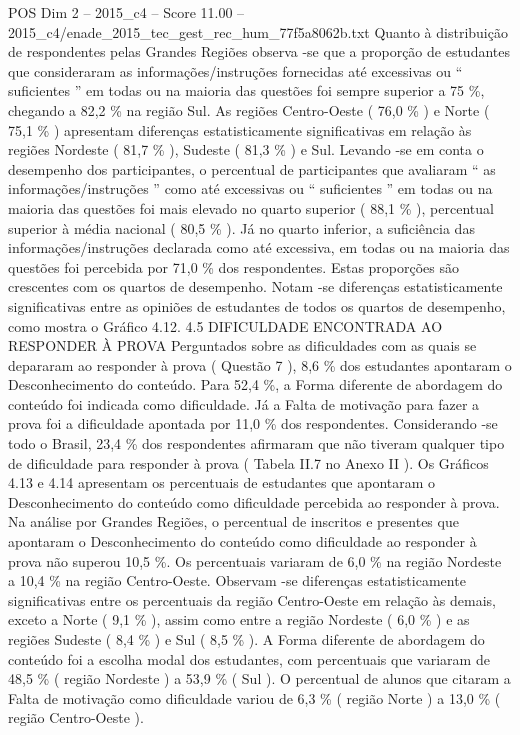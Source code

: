 \begin{textsample}{POS Dim 2 – 2015\_c4 – Score 11.00 – 2015\_c4/enade\_2015\_tec\_gest\_rec\_hum\_77f5a8062b.txt}
Quanto à distribuição de respondentes pelas Grandes Regiões observa -se que a proporção de estudantes que consideraram as informações/instruções fornecidas até excessivas ou “ suficientes ” em todas ou na maioria das questões foi sempre superior a 75 \%, chegando a 82,2 \% na região Sul.
As regiões Centro-Oeste ( 76,0 \% ) e Norte ( 75,1 \% ) apresentam diferenças estatisticamente significativas em relação às regiões Nordeste ( 81,7 \% ), Sudeste ( 81,3 \% ) e Sul.
Levando -se em conta o desempenho dos participantes, o percentual de participantes que avaliaram “ as informações/instruções ” como até excessivas ou “ suficientes ” em todas ou na maioria das questões foi mais elevado no quarto superior ( 88,1 \% ), percentual superior à média nacional ( 80,5 \% ).
Já no quarto inferior, a suficiência das informações/instruções declarada como até excessiva, em todas ou na maioria das questões foi percebida por 71,0 \% dos respondentes.
Estas proporções são crescentes com os quartos de desempenho.
Notam -se diferenças estatisticamente significativas entre as opiniões de estudantes de todos os quartos de desempenho, como mostra o Gráfico 4.12. 4.5 DIFICULDADE ENCONTRADA AO RESPONDER À PROVA Perguntados sobre as dificuldades com as quais se depararam ao responder à prova ( Questão 7 ), 8,6 \% dos estudantes apontaram o Desconhecimento do conteúdo.
Para 52,4 \%, a Forma diferente de abordagem do conteúdo foi indicada como dificuldade.
Já a Falta de motivação para fazer a prova foi a dificuldade apontada por 11,0 \% dos respondentes.
Considerando -se todo o Brasil, 23,4 \% dos respondentes afirmaram que não tiveram qualquer tipo de dificuldade para responder à prova ( Tabela II.7 no Anexo II ).
Os Gráficos 4.13 e 4.14 apresentam os percentuais de estudantes que apontaram o Desconhecimento do conteúdo como dificuldade percebida ao responder à prova.
Na análise por Grandes Regiões, o percentual de inscritos e presentes que apontaram o Desconhecimento do conteúdo como dificuldade ao responder à prova não superou 10,5 \%.
Os percentuais variaram de 6,0 \% na região Nordeste a 10,4 \% na região Centro-Oeste.
Observam -se diferenças estatisticamente significativas entre os percentuais da região Centro-Oeste em relação às demais, exceto a Norte ( 9,1 \% ), assim como entre a região Nordeste ( 6,0 \% ) e as regiões Sudeste ( 8,4 \% ) e Sul ( 8,5 \% ).
A Forma diferente de abordagem do conteúdo foi a escolha modal dos estudantes, com percentuais que variaram de 48,5 \% ( região Nordeste ) a 53,9 \% ( Sul ).
O percentual de alunos que citaram a Falta de motivação como dificuldade variou de 6,3 \% ( região Norte ) a 13,0 \% ( região Centro-Oeste ).

\end{textsample}
